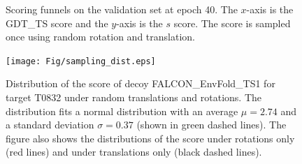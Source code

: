 \documentclass[letter,10pt]{article}
\begin{document}
\begin{figure}[H]

    \centering

    \caption{Scoring funnels on the validation set at epoch 40. The
      $x$-axis is the GDT\_TS score and the $y$-axis is the $s$
      score. The score is sampled once using random rotation and
      translation.}
%
    \label{Fig:ValidationEpoch40}
\end{figure}



\begin{figure}[H]
    \centering
    \texttt{[image: Fig/sampling\_dist.eps]}
%
    \caption{Distribution of the score of decoy FALCON\_EnvFold\_TS1
    for target T0832 under random translations and rotations. The
    distribution fits a normal distribution with an average $\mu =
    2.74$ and a standard deviation $\sigma = 0.37$ (shown in green
    dashed lines). The figure also shows the distributions of the
    score under rotations only (red lines) and under translations only
    (black dashed lines).}
%
    \label{Fig:ScoreDistribution}
\end{figure}
\end{document}

